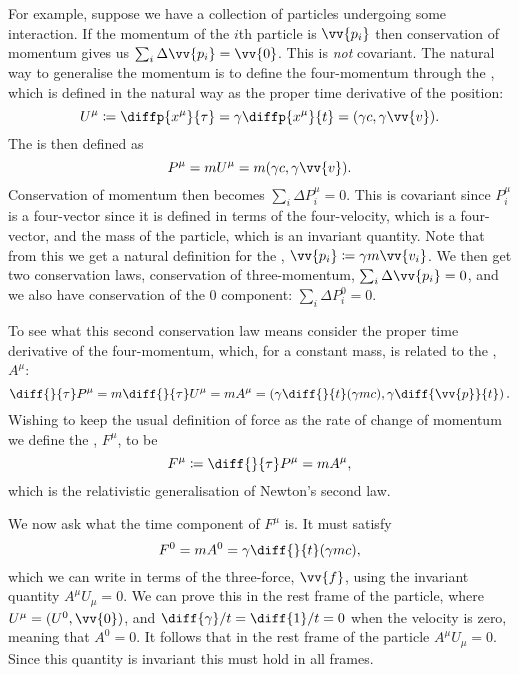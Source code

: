 \documentclass[fleqn]{NotesClass}
\begin{document}
    For example, suppose we have a collection of particles undergoing some interaction.
    If the momentum of the \(i\)th particle is \(\vv{p_i}\) then conservation of momentum gives us \(\sum_i \Delta\vv{p_i} = \vv{0}\).
    This is \emph{not} covariant.
    The natural way to generalise the momentum is to define the four-momentum through the , which is defined in the natural way as the proper time derivative of the position:
    \begin{equation}
        U^\mu \coloneqq \diffp{x^\mu}{\tau} = \gamma \diffp{x^\mu}{t} = (\gamma c, \gamma\vv{v}).
    \end{equation}
    The  is then defined as
    \begin{equation}
        P^\mu = mU^\mu = m(\gamma c, \gamma\vv{v}).
    \end{equation}
    Conservation of momentum then becomes \(\sum_i \Delta P_i^\mu = 0\).
    This is covariant since \(P_i^\mu\) is a four-vector since it is defined in terms of the four-velocity, which is a four-vector, and the mass of the particle, which is an invariant quantity.
    Note that from this we get a natural definition for the , \(\vv{p_i} \coloneqq \gamma m\vv{v_i}\).
    We then get two conservation laws, conservation of three-momentum, \(\sum_i \Delta \vv{p_i} = 0\), and we also have conservation of the 0 component: \(\sum_i \Delta P_i^0 = 0\).
    
    To see what this second conservation law means consider the proper time derivative of the four-momentum, which, for a constant mass, is related to the , \(A^\mu\):
    \begin{equation}
        \diff{}{\tau} P^\mu = m \diff{}{\tau} U^\mu = m A^\mu = \left( \gamma \diff{}{t}(\gamma mc), \gamma \diff{\vv{p}}{t} \right).
    \end{equation}
    Wishing to keep the usual definition of force as the rate of change of momentum we define the , \(F^\mu\), to be
    \begin{equation}
        F^\mu \coloneqq \diff{}{\tau} P^\mu = mA^\mu,
    \end{equation}
    which is the relativistic generalisation of Newton's second law.
    
    We now ask what the time component of \(F^\mu\) is.
    It must satisfy
    \begin{equation}
        F^0 = mA^0 = \gamma \diff{}{t}(\gamma mc),
    \end{equation}
    which we can write in terms of the three-force, \(\vv{f}\), using the invariant quantity \(A^\mu U_\mu = 0\).
    We can prove this in the rest frame of the particle, where \(U^\mu = (U^0, \vv{0})\), and \(\diff{\gamma}/{t} = \diff{1}/{t} = 0\) when the velocity is zero, meaning that \(A^0 = 0\).
    It follows that in the rest frame of the particle \(A^\mu U_\mu =  0\).
    Since this quantity is invariant this must hold in all frames.
    
\end{document}
